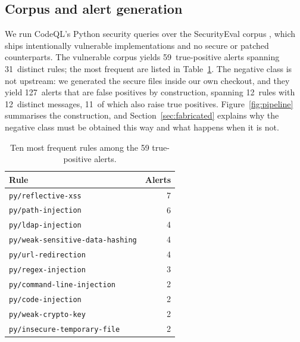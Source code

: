 \documentclass[journal]{IEEEtran}
\providecommand{\citep}[1]{\cite{#1}}
\theoremstyle{definition}
\newcommand{\RNtp}{59}
\newcommand{\RNfp}{127}
\newcommand{\RNrulesFp}{12}
\newcommand{\RNmsgFp}{12}
\newcommand{\RNrulesTp}{31}
\newcommand{\RNrulesShared}{11}
\begin{document}
\subsection{Corpus and alert generation}
We run CodeQL's Python security queries over the SecurityEval corpus
\citep{siddiq2022securityeval}, which ships intentionally vulnerable
implementations and no secure or patched counterparts. The vulnerable corpus
yields \RNtp\ true-positive alerts spanning \RNrulesTp\ distinct rules; the most
frequent are listed in Table~\ref{tab:alerts}. The negative class is not
upstream: we generated the secure files inside our own checkout, and they yield
\RNfp\ alerts that are false positives by construction, spanning \RNrulesFp\
rules with \RNmsgFp\ distinct messages, \RNrulesShared\ of which also raise true
positives.
Figure~\ref{fig:pipeline} summarises the construction, and
Section~\ref{sec:fabricated} explains why the negative class must be obtained
this way and what happens when it is not.

\begin{table}[t]
\caption{Ten most frequent rules among the \RNtp{} true-positive alerts.}
\label{tab:alerts}
\centering
\footnotesize
\begin{tabular}{lr}
\toprule
Rule & Alerts \\
\midrule
\texttt{py/\allowbreak{}reflective-\allowbreak{}xss} & 7 \\
\texttt{py/\allowbreak{}path-\allowbreak{}injection} & 6 \\
\texttt{py/\allowbreak{}ldap-\allowbreak{}injection} & 4 \\
\texttt{py/\allowbreak{}weak-\allowbreak{}sensitive-\allowbreak{}data-\allowbreak{}hashing} & 4 \\
\texttt{py/\allowbreak{}url-\allowbreak{}redirection} & 4 \\
\texttt{py/\allowbreak{}regex-\allowbreak{}injection} & 3 \\
\texttt{py/\allowbreak{}command-\allowbreak{}line-\allowbreak{}injection} & 2 \\
\texttt{py/\allowbreak{}code-\allowbreak{}injection} & 2 \\
\texttt{py/\allowbreak{}weak-\allowbreak{}crypto-\allowbreak{}key} & 2 \\
\texttt{py/\allowbreak{}insecure-\allowbreak{}temporary-\allowbreak{}file} & 2 \\
\bottomrule
\end{tabular}
\end{table}
\end{document}
